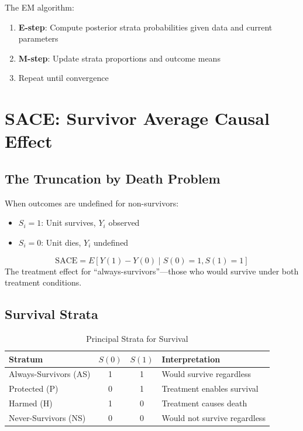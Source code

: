 The EM algorithm:
\begin{enumerate}
\item \textbf{E-step}: Compute posterior strata probabilities given data and current parameters
\item \textbf{M-step}: Update strata proportions and outcome means
\item Repeat until convergence
\end{enumerate}


\section{SACE: Survivor Average Causal Effect}

\subsection{The Truncation by Death Problem}

When outcomes are undefined for non-survivors:
\begin{itemize}
\item $S_i = 1$: Unit survives, $Y_i$ observed
\item $S_i = 0$: Unit dies, $Y_i$ undefined
\end{itemize}

\begin{definition}[SACE]
\begin{equation}
\text{SACE} = E[Y(1) - Y(0) \mid S(0) = 1, S(1) = 1]
\end{equation}
The treatment effect for ``always-survivors''---those who would survive under both treatment conditions.
\end{definition}

\subsection{Survival Strata}

\begin{table}[h]
\centering
\caption{Principal Strata for Survival}
\begin{tabular}{lccl}
\toprule
Stratum & $S(0)$ & $S(1)$ & Interpretation \\
\midrule
Always-Survivors (AS) & 1 & 1 & Would survive regardless \\
Protected (P) & 0 & 1 & Treatment enables survival \\
Harmed (H) & 1 & 0 & Treatment causes death \\
Never-Survivors (NS) & 0 & 0 & Would not survive regardless \\
\bottomrule
\end{tabular}
\end{table}

